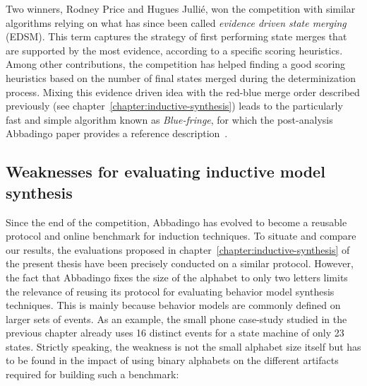 Two winners, Rodney Price and Hugues Julli\'e, won the competition with similar algorithms relying on what has since been called \emph{evidence driven state merging} (EDSM). This term captures the strategy of first performing state merges that are supported by the most evidence, according to a specific scoring heuristics. Among other contributions, the competition has helped finding a good scoring heuristics based on the number of final states merged during the determinization process. Mixing this evidence driven idea with the red-blue merge order described previously (see chapter~\ref{chapter:inductive-synthesis}) leads to the particularly fast and simple algorithm known as \emph{Blue-fringe}, for which the post-analysis Abbadingo paper provides a reference description~\cite{Lang98}.

\subsection{Weaknesses for evaluating inductive model synthesis}

Since the end of the competition, Abbadingo has evolved to become a reusable protocol and online benchmark for induction techniques. To situate and compare our results, the evaluations proposed in chapter~\ref{chapter:inductive-synthesis} of the present thesis have been precisely conducted on a similar protocol. However, the fact that Abbadingo fixes the size of the alphabet to only two letters limits the relevance of reusing its protocol for evaluating behavior model synthesis techniques. This is mainly because behavior models are commonly defined on larger sets of events. As an example, the small phone case-study studied in the previous chapter already uses 16 distinct events for a state machine of only 23 states. Strictly speaking, the weakness is not the small alphabet size itself but has to be found in the impact of using binary alphabets on the different artifacts required for building such a benchmark:

